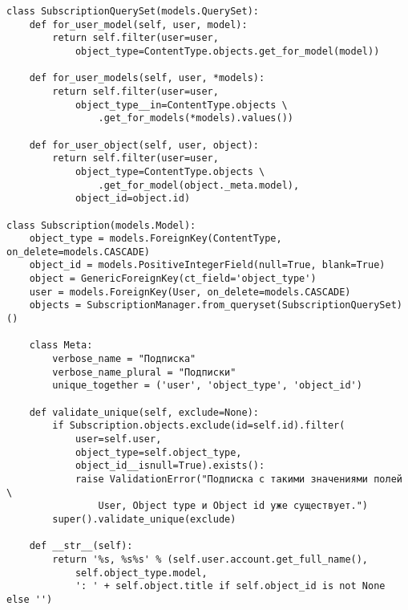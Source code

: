 \documentclass[12pt, a4paper, oneside]{article}
\begin{document}
\begin{verbatim}
class SubscriptionQuerySet(models.QuerySet):
    def for_user_model(self, user, model):
        return self.filter(user=user, 
            object_type=ContentType.objects.get_for_model(model))

    def for_user_models(self, user, *models):
        return self.filter(user=user, 
            object_type__in=ContentType.objects \
                .get_for_models(*models).values())
    
    def for_user_object(self, user, object):
        return self.filter(user=user, 
            object_type=ContentType.objects \
                .get_for_model(object._meta.model),
            object_id=object.id)

class Subscription(models.Model):
    object_type = models.ForeignKey(ContentType, on_delete=models.CASCADE)
    object_id = models.PositiveIntegerField(null=True, blank=True)
    object = GenericForeignKey(ct_field='object_type')
    user = models.ForeignKey(User, on_delete=models.CASCADE)
    objects = SubscriptionManager.from_queryset(SubscriptionQuerySet)()

    class Meta:
        verbose_name = "Подписка"
        verbose_name_plural = "Подписки"
        unique_together = ('user', 'object_type', 'object_id')

    def validate_unique(self, exclude=None):
        if Subscription.objects.exclude(id=self.id).filter(
            user=self.user, 
            object_type=self.object_type, 
            object_id__isnull=True).exists():
            raise ValidationError("Подписка с такими значениями полей \
                User, Object type и Object id уже существует.")
        super().validate_unique(exclude)

    def __str__(self):
        return '%s, %s%s' % (self.user.account.get_full_name(), 
            self.object_type.model,
            ': ' + self.object.title if self.object_id is not None else '')
\end{verbatim}
\newpage
\end{document}
